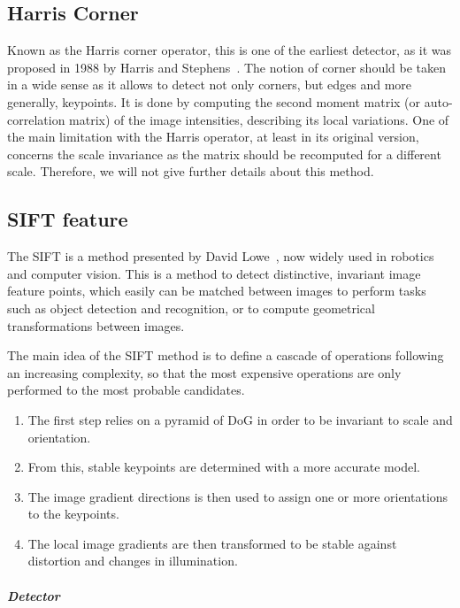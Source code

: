 \subsection{Harris Corner}

Known as the Harris corner operator, this is one of the earliest detector, as it was proposed in 1988 by Harris and Stephens~\cite{Harris88alvey}. The  notion of corner should be taken in a wide sense as it allows to detect not only corners, but edges and more generally, keypoints. It is done by computing the second moment matrix (or auto-correlation matrix) of the image intensities, describing its local variations. One of the main limitation with the Harris operator, at least in its original version, concerns the scale invariance as the matrix should be recomputed for a different scale. Therefore, we will not give further details about this method.

\subsection{SIFT feature}

The \gls{SIFT} is a method presented by David Lowe~\cite{lowe_2004_sift}, now widely used in robotics and computer vision.
This is a method to detect distinctive, invariant image feature points, which easily can be matched between images to perform tasks such as object detection and recognition, or to compute geometrical transformations between images.

The main idea of the \gls{SIFT} method is to define a cascade of operations following an increasing complexity, so that the most expensive operations are only performed to the most probable candidates.
\begin{enumerate}
\item The first step relies on a pyramid of \gls{DoG} in order to be invariant to scale and orientation.
\item From this, stable keypoints are determined with a more accurate model.
\item The image gradient directions is then used to assign one or more orientations to the keypoints.
\item The local image gradients are then transformed to be stable against distortion and changes in illumination.
\end{enumerate}

\clearpage
\paragraph{\emph{Detector}}

